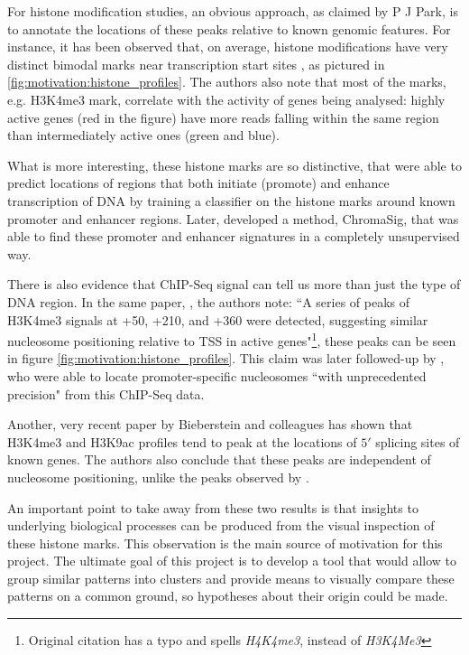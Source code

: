 \documentclass[parskip]{cs4rep}
\newcommand{\histonemodification}[1]{#1}
\begin{document}
For histone modification studies, an obvious approach, as claimed by P J Park, is to annotate the locations of these peaks relative to known genomic features. For instance, it has been observed
that, on average, histone modifications have very distinct bimodal marks near transcription start sites  \cite{Barski:2007ww}, as pictured in \autoref{fig:motivation:histone_profiles}. The authors also note that most of the marks, e.g.
\histonemodification{H3K4me3} mark, correlate with the activity of genes being analysed: highly active genes (red in the figure) have more reads falling within the same region than intermediately active ones (green and blue).

What is more interesting, these histone marks are so distinctive, that 
\cite{Heintzman:2007ke} were able to predict locations of regions that both initiate (promote) and enhance transcription of DNA by training a classifier on the histone marks around known promoter and enhancer regions. Later, \cite{Hon:2008wv} developed a method, ChromaSig, that was able to find these promoter and enhancer signatures in a completely unsupervised way.

There is also evidence that ChIP-Seq signal can tell us more than just the type of DNA region. In the same paper, \cite{Barski:2007ww}, the authors note: ``A series of peaks of H3K4me3 signals at +50, +210, and +360 were detected, suggesting similar nucleosome positioning relative to TSS in active genes"\footnote{Original citation has a typo and spells \emph{H4K4me3}, instead of \emph{H3K4Me3}}, these peaks can be seen in figure \autoref{fig:motivation:histone_profiles}. This claim was later followed-up by \cite{Schmid:2007ue}, who were able to locate promoter-specific nucleosomes ``with unprecedented precision" from this ChIP-Seq data.

Another, very recent paper by Bieberstein and colleagues\cite{Bieberstein:2012tf} has shown that \histonemodification{H3K4me3} and \histonemodification{H3K9ac} profiles tend to peak at the locations of $5'$ splicing sites of known genes. The authors also conclude that these peaks are independent of nucleosome positioning, unlike the peaks observed by \cite{Barski:2007ww}.

An important point to take away from these two results is that insights to underlying biological processes can be produced from the visual inspection of these histone marks. This observation is the main source of motivation for this project. The ultimate goal of this project is to develop a tool that would allow to group similar patterns into clusters and provide means to visually compare these patterns on a common ground, so hypotheses about their origin could be made.
\end{document}
